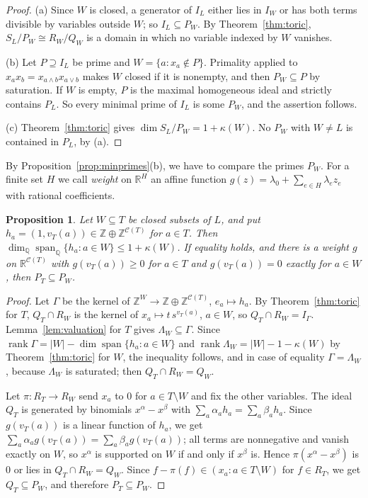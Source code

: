 \documentclass{amsart}
\newtheorem{proposition}[theorem]{Proposition}
\theoremstyle{definition}
\DeclareMathOperator{\rk}{rank}
\newcommand{\cC}{\mathcal C}
\newcommand{\Q}{\mathbb Q}
\newcommand{\Z}{\mathbb Z}
\newcommand{\R}{\mathbb R}
\begin{document}
\begin{proof}
(a) Since $W$ is closed, a generator of $I_L$ either lies in $I_W$ or has both terms divisible by variables outside $W$; so $I_L\subseteq P_W$. By Theorem~\ref{thm:toric}, $S_L/P_W\cong R_W/Q_W$ is a domain in which no variable indexed by $W$ vanishes.

(b) Let $P\supseteq I_L$ be prime and $W=\{a:x_a\notin P\}$. Primality applied to $x_ax_b=x_{a\wedge b}x_{a\vee b}$ makes $W$ closed if it is nonempty, and then $P_W\subseteq P$ by saturation. If $W$ is empty, $P$ is the maximal homogeneous ideal and strictly contains $P_L$. So every minimal prime of $I_L$ is some $P_W$, and the assertion follows.

(c) Theorem~\ref{thm:toric} gives $\dim S_L/P_W=1+\kappa(W)$. No $P_W$ with $W\ne L$ is contained in $P_L$, by (a).
\end{proof}

By Proposition~\ref{prop:minprimes}(b), we have to compare the primes $P_W$. For a finite set $H$ we call \emph{weight} on $\R^H$ an affine function $g(z)=\lambda_0+\sum_{e\in H}\lambda_ez_e$ with rational coefficients.

\begin{proposition}\label{prop:inclusion}
Let $W\subseteq T$ be closed subsets of $L$, and put $h_a=(1,v_T(a))\in\Z\oplus\Z^{\cC(T)}$ for $a\in T$. Then $\dim_\Q\operatorname{span}_\Q\{h_a:a\in W\}\le1+\kappa(W)$. If equality holds, and there is a weight $g$ on $\R^{\cC(T)}$ with $g(v_T(a))\ge0$ for $a\in T$ and $g(v_T(a))=0$ exactly for $a\in W$, then $P_T\subseteq P_W$.
\end{proposition}

\begin{proof}
Let $\Gamma$ be the kernel of $\Z^W\to\Z\oplus\Z^{\cC(T)}$, $e_a\mapsto h_a$. By Theorem~\ref{thm:toric} for $T$, $Q_T\cap R_W$ is the kernel of $x_a\mapsto t\,s^{v_T(a)}$, $a\in W$, so $Q_T\cap R_W=I_\Gamma$. Lemma~\ref{lem:valuation} for $T$ gives $\Lambda_W\subseteq\Gamma$. Since $\rk\Gamma=|W|-\dim\operatorname{span}\{h_a:a\in W\}$ and $\rk\Lambda_W=|W|-1-\kappa(W)$ by Theorem~\ref{thm:toric} for $W$, the inequality follows, and in case of equality $\Gamma=\Lambda_W$, because $\Lambda_W$ is saturated; then $Q_T\cap R_W=Q_W$.

Let $\pi:R_T\to R_W$ send $x_a$ to $0$ for $a\in T\setminus W$ and fix the other variables. The ideal $Q_T$ is generated by binomials $x^\alpha-x^\beta$ with $\sum_a\alpha_ah_a=\sum_a\beta_ah_a$. Since $g(v_T(a))$ is a linear function of $h_a$, we get $\sum_a\alpha_ag(v_T(a))=\sum_a\beta_ag(v_T(a))$; all terms are nonnegative and vanish exactly on $W$, so $x^\alpha$ is supported on $W$ if and only if $x^\beta$ is. Hence $\pi(x^\alpha-x^\beta)$ is $0$ or lies in $Q_T\cap R_W=Q_W$. Since $f-\pi(f)\in(x_a:a\in T\setminus W)$ for $f\in R_T$, we get $Q_T\subseteq P_W$, and therefore $P_T\subseteq P_W$.
\end{proof}
\end{document}

